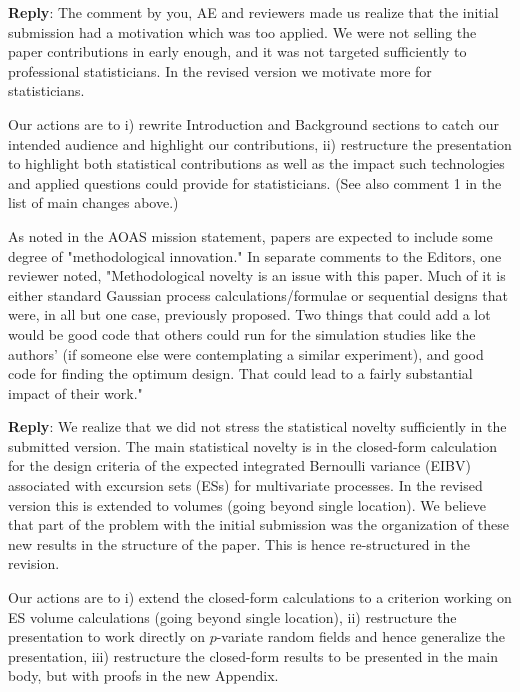 \documentclass[a4paper]{article}
\newcounter{reviewer}
\def\reply{\textbf{Reply}}
\begin{document}
\reply: The comment by you, AE and reviewers made us realize that the initial submission had a motivation which was too applied. We were not selling the paper contributions in early enough, and it was not targeted sufficiently to professional statisticians. In the revised version we motivate more for statisticians. 
 
Our actions are to i) rewrite Introduction and Background sections to catch our intended audience and highlight our contributions, ii) restructure the presentation to highlight both statistical contributions as well as the impact such technologies and applied questions could provide for statisticians. 
(See also comment 1 in the list of main changes above.)

\vspace{5mm}

As noted in the AOAS mission statement, papers are expected
to include some degree of "methodological innovation."
In separate comments to the Editors, one reviewer noted,
"Methodological novelty is an issue with this paper.  Much of 
it is either standard Gaussian process calculations/formulae 
or sequential designs that were, in all but one case, previously 
proposed. Two things that could add a lot would be good code 
that others could run for the simulation studies like the authors' 
(if someone else were contemplating a similar experiment), and 
good code for finding the optimum design. That could lead to a 
fairly substantial impact of their work."

\reply: We realize that we did not stress the statistical novelty sufficiently in the submitted version. The main statistical novelty is in the closed-form calculation for the design criteria of the expected integrated Bernoulli variance (EIBV) associated with excursion sets (ESs) for multivariate processes. In the revised version this is extended to volumes (going beyond single location). We believe that part of the problem with the initial submission was the organization of these new results in the structure of the paper. This is hence re-structured in the revision.

Our actions are to i) extend the closed-form calculations to a criterion working on ES volume calculations (going beyond single location), ii) restructure the presentation to work directly on $p$-variate random fields and hence generalize the presentation, iii) restructure the closed-form results to be presented in the main body, but with proofs in the new Appendix.
\end{document}
